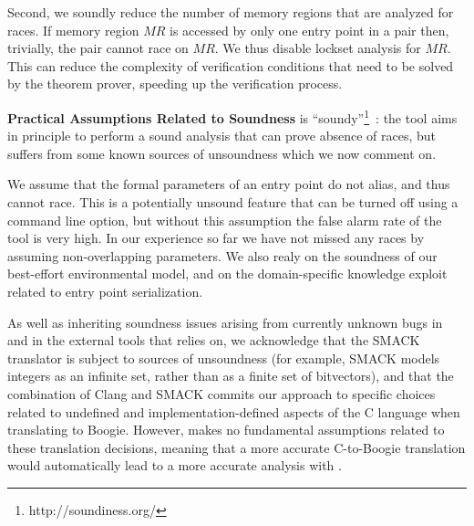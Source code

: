 
Second, we soundly reduce the number of memory regions that are analyzed for races.  If memory region $\mathit{MR}$ is accessed by only one entry point in a pair then, trivially, the pair cannot race on $\mathit{MR}$.  We thus disable lockset analysis for $\mathit{MR}$.  This can reduce the complexity of verification conditions that need to be solved by the theorem prover, speeding up the verification process.

\medskip\noindent\textbf{Practical Assumptions Related to Soundness}
%
\whoop is ``soundy''\footnote{http://soundiness.org/}~\cite{soundiness}: the tool aims in principle to perform a sound analysis
that can prove absence of races, but suffers from some known sources of unsoundness
which we now comment on.

We assume that the formal parameters of an entry point do not alias, and thus cannot race. This is a potentially unsound feature that can be turned off using a command line option, but without this assumption the false alarm rate of the tool is very high. In our experience so far we have not missed any races by assuming non-overlapping parameters.  We also realy on the soundness of our best-effort environmental model, and on the domain-specific knowledge exploit related to entry point serialization.

As well as inheriting soundness issues arising from currently unknown bugs in 
\whoop and in the external tools that \whoop relies on,
we acknowledge that the SMACK translator is subject to sources of
unsoundness (for example, SMACK models integers as an infinite set,
rather than as a finite set of bitvectors), and that the combination
of Clang and SMACK commits our approach to specific choices related to
undefined and implementation-defined aspects of the C language when
translating to Boogie.  However, \whoop makes no fundamental
assumptions related to these translation decisions, meaning that a
more accurate C-to-Boogie translation would automatically lead to a
more accurate analysis with \whoop.

